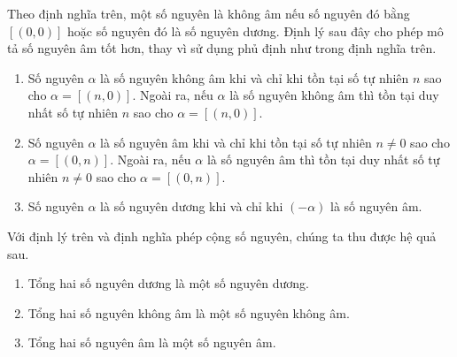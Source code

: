 Theo định nghĩa trên, một số nguyên là không âm nếu số nguyên đó bằng $[(0, 0)]$ hoặc số nguyên đó là số nguyên dương. Định lý sau đây cho phép mô tả số nguyên âm tốt hơn, thay vì sử dụng phủ định như trong định nghĩa trên.
\begin{theorem}\label{theorem:positive-negative-nonnegative-integers}
    \begin{enumerate}[label={(\roman*)}]
        \item Số nguyên $\alpha$ là số nguyên không âm khi và chỉ khi tồn tại số tự nhiên $n$ sao cho $\alpha = [(n, 0)]$. Ngoài ra, nếu $\alpha$ là số nguyên không âm thì tồn tại duy nhất số tự nhiên $n$ sao cho $\alpha = [(n, 0)]$.
        \item Số nguyên $\alpha$ là số nguyên âm khi và chỉ khi tồn tại số tự nhiên $n\ne 0$ sao cho $\alpha = [(0, n)]$. Ngoài ra, nếu $\alpha$ là số nguyên âm thì tồn tại duy nhất số tự nhiên $n\ne 0$ sao cho $\alpha = [(0, n)]$.
        \item Số nguyên $\alpha$ là số nguyên dương khi và chỉ khi $(-\alpha)$ là số nguyên âm.
    \end{enumerate}
\end{theorem}

Với định lý trên và định nghĩa phép cộng số nguyên, chúng ta thu được hệ quả sau.
\begin{corollary}\label{corollary:positivity-negativity-nonnegativity-of-sum-of-integers}
    \begin{enumerate}[label={(\roman*)}]
        \item Tổng hai số nguyên dương là một số nguyên dương.
        \item Tổng hai số nguyên không âm là một số nguyên không âm.
        \item Tổng hai số nguyên âm là một số nguyên âm.
    \end{enumerate}
\end{corollary}

